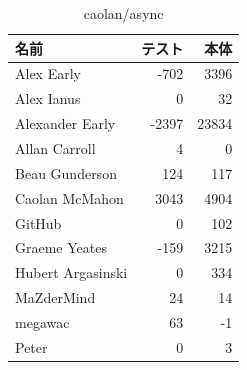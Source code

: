 \begin{table}[htb]
\begin{center}
\caption{caolan/async}
\begin{tabular}{|l|r|r|} \hline 
名前 & テスト & 本体 \\ \hline \hline
Alex Early & -702 & 3396\\ \hline
Alex Ianus & 0 & 32\\ \hline
Alexander Early & -2397 & 23834\\ \hline
Allan Carroll & 4 & 0\\ \hline
Beau Gunderson & 124 & 117\\ \hline
Caolan McMahon & 3043 & 4904\\ \hline
GitHub & 0 & 102\\ \hline
Graeme Yeates & -159 & 3215\\ \hline
Hubert Argasinski & 0 & 334\\ \hline
MaZderMind & 24 & 14\\ \hline
megawac & 63 & -1\\ \hline
Peter & 0 & 3\\ \hline
\end{tabular}
\end{center}
\end{table}

